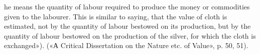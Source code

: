 he means the quantity of labour required to produce the money or commodities
given to the labourer. This is similar to saying, that the value of cloth
is estimated, not by the quantity of labour bestowed on its production,
but by the quantity of labour bestowed on the production of the silver,
for which the cloth is exchanged»). («А Critical Dissertation on the Nature
etc. of Value», p. 50, 51).
